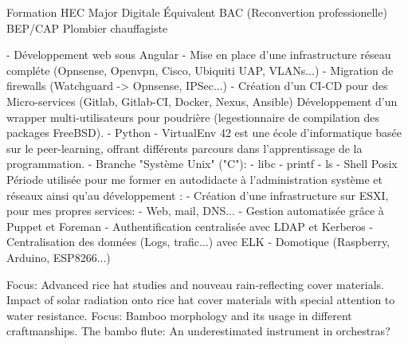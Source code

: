 \documentclass[
	a4paper,
]{FortySecondsCV/fortysecondscv}
\begin{document}
\makefrontsidebar

\begin{cvtable}[1.5]
		{Formation HEC Major Digitale}
		{Équivalent BAC (Reconvertion professionelle)}
		{BEP/CAP Plombier chauffagiste}
\end{cvtable}

\begin{cvtable}[3]
		{
			\tabto{2mm}- Développement web sous Angular
			\tabto{2mm}- Mise en place  d'une infrastructure réseau compléte (Opnsense, Openvpn, Cisco, Ubiquiti UAP, VLANs...)
			\tabto{2mm}- Migration de firewalls (Watchguard -> Opnsense, IPSec...)
			\tabto{2mm}- Création d'un CI-CD pour des Micro-services (Gitlab, Gitlab-CI, Docker, Nexus, Ansible)
		}
		{
			Développement d’un wrapper multi-utilisateurs pour poudrière (legestionnaire de compilation des packages FreeBSD).
				\tabto{5mm}- Python
				\tabto{5mm}- VirtualEnv
		}
	{
	42 est une école d'informatique basée sur le peer-learning, offrant différents parcours dans l'apprentissage de la programmation.
		\tabto{2mm}- Branche "Système Unix" ("C"):
   			\tabto{5mm}- libc
			\tabto{5mm}- printf
     		\tabto{5mm}- ls
     		\tabto{5mm}- Shell Posix
	}
	{
		Période utilisée pour me former en autodidacte à l'administration système et réseaux ainsi qu'au développement :
		\tabto{2mm}- Création d'une infrastructure sur ESXI, pour mes propres services:
			\tabto{5mm}- Web, mail, DNS...
			\tabto{5mm}- Gestion automatisée grâce à Puppet et Foreman
			\tabto{5mm}- Authentification centralisée avec LDAP et Kerberos
			\tabto{5mm}- Centralisation des données (Logs, trafic...) avec ELK
		\tabto{2mm}- Domotique (Raspberry, Arduino, ESP8266...)
	}
\end{cvtable}





\begin{cvtable}[1.5]
		{Focus: Advanced rice hat studies and nouveau rain-reflecting cover
		materials.}
		{Impact of solar radiation onto rice hat cover materials with special
		attention to water resistance.}
		{Focus: Bamboo morphology and its usage in different craftmanships.}
		{The bambo flute: An underestimated instrument in orchestras?}
\end{cvtable}
\end{document}
